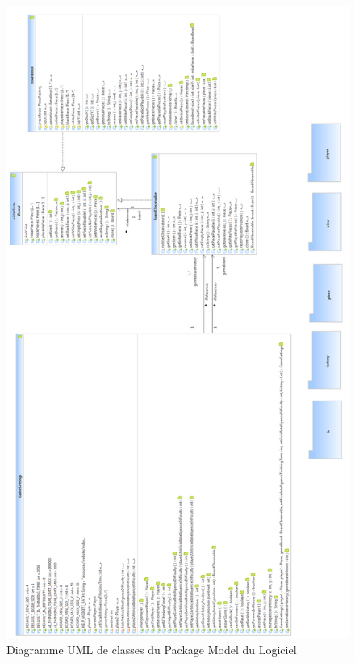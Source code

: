 \documentclass[a4paper,12pt]{report}
\begin{document}
\label{OthKerModel}
\begin{figure}[H]
\centering
 \includegraphics[scale=0.32]{Kernel/Pack_com_model.png}
\caption{Diagramme UML de classes du Package Model du Logiciel}
\end{figure}
\end{document}
